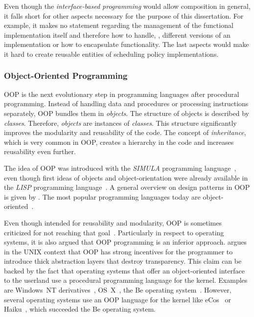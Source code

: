 Even though the \emph{interface-based programming} would allow composition in general, it falls short for other aspects necessary for the purpose of this dissertation. For example, it makes no statement regarding the management of the functional implementation itself and therefore how to handle, \eg{}, different versions of an implementation or how to encapsulate functionality. The last aspects would make it hard to create reusable entities of scheduling policy implementations.

\subsubsection{Object-Oriented Programming}

\ac{OOP} is the next evolutionary step in programming languages after procedural programming. Instead of handling data and procedures or processing instructions separately, \ac{OOP} bundles them in \emph{objects}. The structure of objects is described by \emph{classes}. Therefore, \emph{objects} are instances of \emph{classes}. This structure significantly improves the modularity and reusability of the code. The concept of \emph{inheritance}, which is very common in \ac{OOP}, creates a hierarchy in the code and increases reusability even further.

The idea of \ac{OOP} was introduced with the \emph{SIMULA} programming language~\cite{Holmevik-1994-Simula}, even though first ideas of objects and object-orientation were already available in the \emph{LISP} programming language~\cite{McCarthy-1960-LISP1,McCarthy-1962-LISP1.5}. A general overview on design patterns in \ac{OOP} is given by \textcite{Gamma-1995-DesignPattnerns}. The most popular programming languages today are object-oriented~\cite{tiobe-2015-may}.

Even though intended for reusability and modularity, \ac{OOP} is sometimes criticized for not reaching that goal~\cite{Cardelli-1996-BadEngineeringProperties}. Particularly in respect to operating systems, it is also argued that \ac{OOP} programming is an inferior approach. \textcite[101--103]{Raymond-2003-ArtOfUNIX} argues in the UNIX context that \ac{OOP} has strong incentives for the programmer to introduce thick abstraction layers that destroy transparency. This claim can be backed by the fact that operating systems that offer an object-oriented interface to the userland use a procedural programming language for the kernel. Examples are Windows~NT derivatives~\cite{WRK}, OS~X~\cite{OSX}, the Be operating system~\cite{BeOS}. However, several operating systems use an \ac{OOP} language for the kernel like eCos~\cite{eCos} or Haiku~\cite{Haiku}, which succeeded the Be operating system.

